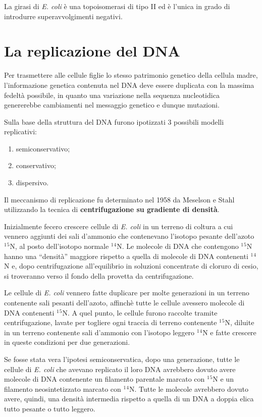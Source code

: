 \documentclass[11pt]{book}
\begin{document}
La girasi di \emph{E. coli} è una topoisomerasi di tipo II ed è l'unica
in grado di introdurre superavvolgimenti negativi.

\chapter{La replicazione del DNA}\label{la-replicazione-del-dna}

Per trasmettere alle cellule figlie lo stesso patrimonio genetico della
cellula madre, l'informazione genetica contenuta nel DNA deve essere
duplicata con la massima fedeltà possibile, in quanto una variazione
nella sequenza nucleotidica genererebbe cambiamenti nel messaggio
genetico e dunque mutazioni.

Sulla base della struttura del DNA furono ipotizzati 3 possibili modelli
replicativi:

\begin{enumerate}
\def\labelenumi{\arabic{enumi}.}
\itemsep1pt\parskip0pt
\item
  semiconservativo;
\item
  conservativo;
\item
  dispersivo.
\end{enumerate}

Il meccanismo di replicazione fu determinato nel 1958 da Meselson e
Stahl utilizzando la tecnica di \textbf{centrifugazione su gradiente di
densità}.

Inizialmente fecero crescere cellule di \emph{E. coli} in un terreno di
coltura a cui vennero aggiunti dei sali d'ammonio che contenevano
l'isotopo pesante dell'azoto \(^1\)\(^5\)N, al posto dell'isotopo
normale \(^1\)\(^4\)N. Le molecole di DNA che contengono \(^1\)\(^5\)N
hanno una ``densità'' maggiore rispetto a quella di molecole di DNA
contenenti \(^1\)\(^4\)N e, dopo centrifugazione all'equilibrio in
soluzioni concentrate di cloruro di cesio, si troveranno verso il fondo
della provetta da centrifugazione.

Le cellule di \emph{E. coli} vennero fatte duplicare per molte
generazioni in un terreno contenente sali pesanti dell'azoto, affinchè
tutte le cellule avessero molecole di DNA contenenti \(^1\)\(^5\)N. A
quel punto, le cellule furono raccolte tramite centrifugazione, lavate
per togliere ogni traccia di terreno contenente \(^1\)\(^5\)N, diluite
in un terreno contenente sali d'ammonio con l'isotopo leggero
\(^1\)\(^4\)N e fatte crescere in queste condizioni per due generazioni.

Se fosse stata vera l'ipotesi semiconservatica, dopo una generazione,
tutte le cellule di \emph{E. coli} che avevano replicato il loro DNA
avrebbero dovuto avere molecole di DNA contenente un filamento parentale
marcato con \(^1\)\(^5\)N e un filamento neosintetizzato marcato con
\(^1\)\(^4\)N. Tutte le molecole avrebbero dovuto avere, quindi, una
densità intermedia rispetto a quella di un DNA a doppia elica tutto
pesante o tutto leggero.
\end{document}
